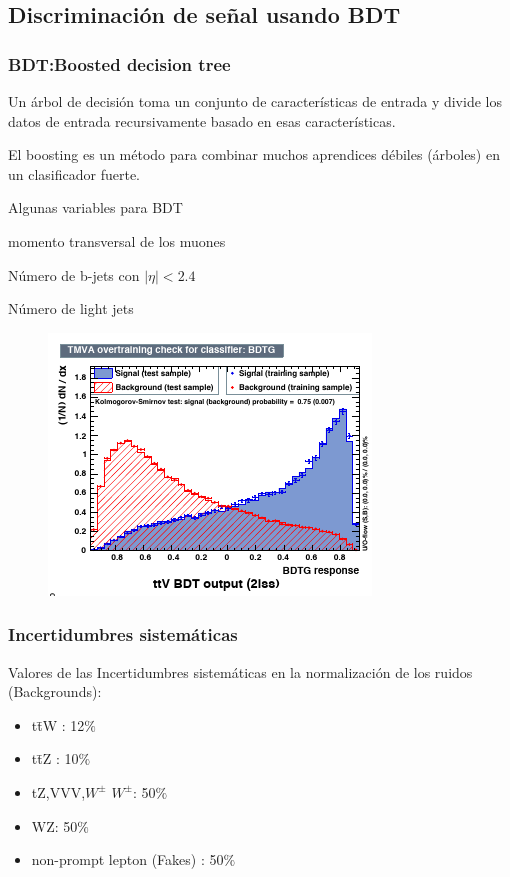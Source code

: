 \documentclass[11pt]{beamer}
\begin{document}
\begin{frame}
\subsection{Discriminaci\'on de se\~nal usando BDT}
\frametitle{BDT:Boosted decision tree}
\begin{multicols}{2}

\begin{itemize}
\tiny{
\item Un árbol de decisión toma un conjunto de características de entrada y divide los datos de entrada
recursivamente basado en esas características.
\item El boosting es un método para combinar muchos aprendices débiles (árboles) en un clasificador fuerte.
\item Algunas variables para BDT
}
\begin{itemize}
\tiny{
	\item  momento transversal  de los muones
	\item N\'umero de  b-jets con $|\eta| < 2.4$
	\item N\'umero de  light jets 
}
\end{itemize}

\end{itemize}

\columnbreak
\begin{center}
	\begin{figure}
		\includegraphics[scale=0.5]{sk.png}
	\end{figure}
	
\end{center}
\end{multicols}
\end{frame}

\begin{frame}
\frametitle{Incertidumbres sistem\'aticas}
Valores de las Incertidumbres sistem\'aticas en la normalizaci\'on de los ruidos (Backgrounds):
\begin{itemize}
	\item t\=tW  : 12$\%$  
	\item t\=tZ : 10$\%$ 
	\item tZ,VVV,$W^{\pm}$ $W^{\pm}$:  50$\%$  
	\item WZ: 50$\%$    
	\item non-prompt lepton (Fakes) : 50$\%$ 
\end{itemize}

\end{frame}
\end{document}
